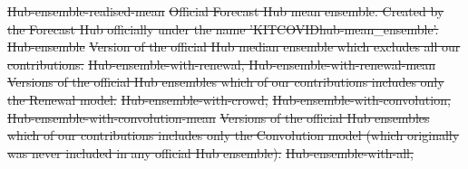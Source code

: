 \documentclass[10pt,letterpaper]{article}
\providecommand{\DIFdeltex}[1]{{\protect\color{red}\sout{#1}}}                      %
\providecommand{\DIFdel}[1]{\texorpdfstring{\DIFdeltex{#1}}{}} %
\begin{document}
\DIFdel{Hub-ensemble-realised-mean }%
\DIFdel{Official Forecast Hub mean ensemble. Created by the Forecast Hub officially under the name 'KITCOVIDhub-mean\_ensemble'.}%
\DIFdel{Hub-ensemble }%
\DIFdel{Version of the official Hub median ensemble which excludes all our contributions.}%
\DIFdel{Hub-ensemble-with-renewal, 
    Hub-ensemble-with-renewal-mean }%
\DIFdel{Versions of the official Hub ensembles which of our contributions includes only the Renewal model.}%
\DIFdel{Hub-ensemble-with-crowd, 
}%
\DIFdel{Hub-ensemble-with-convolution, 
    Hub-ensemble-with-convolution-mean }%
\DIFdel{Versions of the official Hub ensembles which of our contributions includes only the Convolution model (which originally was never included in any official Hub ensemble).}%
\DIFdel{Hub-ensemble-with-all, 
}%
\end{document}
